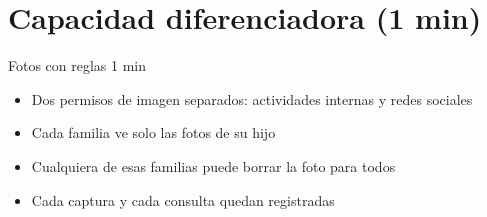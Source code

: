 \section{Capacidad diferenciadora (1 min)}

\begin{frame}{Fotos con reglas \hfill\small 1 min}
  \large
  \begin{itemize}
    \item Dos permisos de imagen separados: actividades internas y redes sociales
    \item Cada familia ve solo las fotos de su hijo
    \item Cualquiera de esas familias puede borrar la foto para todos
    \item Cada captura y cada consulta quedan registradas
  \end{itemize}
\end{frame}

